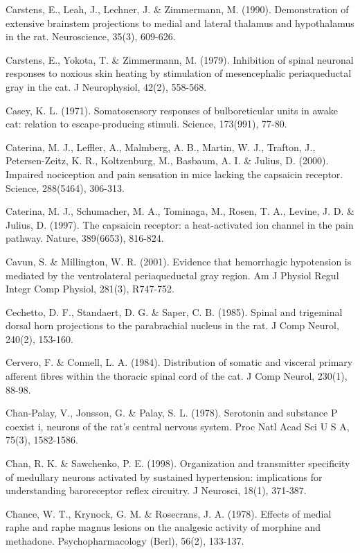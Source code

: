 \documentclass[a4paper,12pt,twoside]{report}
\begin{document}
\begin{singlespacing}
\begin{footnotesize}
Carstens, E., Leah, J., Lechner, J. \& Zimmermann, M. (1990). Demonstration of extensive brainstem projections to medial and lateral thalamus and hypothalamus in the rat. Neuroscience, 35(3), 609-626.

Carstens, E., Yokota, T. \& Zimmermann, M. (1979). Inhibition of spinal neuronal responses to noxious skin heating by stimulation of mesencephalic periaqueductal gray in the cat. J Neurophysiol, 42(2), 558-568.

Casey, K. L. (1971). Somatosensory responses of bulboreticular units in awake cat: relation to escape-producing stimuli. Science, 173(991), 77-80.

Caterina, M. J., Leffler, A., Malmberg, A. B., Martin, W. J., Trafton, J., Petersen-Zeitz, K. R., Koltzenburg, M., Basbaum, A. I. \& Julius, D. (2000). Impaired nociception and pain sensation in mice lacking the capsaicin receptor. Science, 288(5464), 306-313.

Caterina, M. J., Schumacher, M. A., Tominaga, M., Rosen, T. A., Levine, J. D. \& Julius, D. (1997). The capsaicin receptor: a heat-activated ion channel in the pain pathway. Nature, 389(6653), 816-824.

Cavun, S. \& Millington, W. R. (2001). Evidence that hemorrhagic hypotension is mediated by the ventrolateral periaqueductal gray region. Am J Physiol Regul Integr Comp Physiol, 281(3), R747-752.

Cechetto, D. F., Standaert, D. G. \& Saper, C. B. (1985). Spinal and trigeminal dorsal horn projections to the parabrachial nucleus in the rat. J Comp Neurol, 240(2), 153-160.

Cervero, F. \& Connell, L. A. (1984). Distribution of somatic and visceral primary afferent fibres within the thoracic spinal cord of the cat. J Comp Neurol, 230(1), 88-98.

Chan-Palay, V., Jonsson, G. \& Palay, S. L. (1978). Serotonin and substance P coexist i, neurons of the rat's central nervous system. Proc Natl Acad Sci U S A, 75(3), 1582-1586.

Chan, R. K. \& Sawchenko, P. E. (1998). Organization and transmitter specificity of medullary neurons activated by sustained hypertension: implications for understanding baroreceptor reflex circuitry. J Neurosci, 18(1), 371-387.

Chance, W. T., Krynock, G. M. \& Rosecrans, J. A. (1978). Effects of medial raphe and raphe magnus lesions on the analgesic activity of morphine and methadone. Psychopharmacology (Berl), 56(2), 133-137.


\end{footnotesize}
\end{singlespacing}
\end{document}
